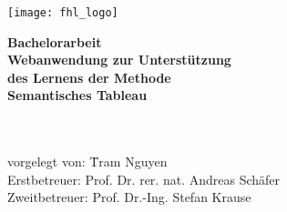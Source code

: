 \begin{center}

\vspace*{-2cm}

\texttt{[image: fhl\_logo]}

\vspace*{3cm}

{\Large \textbf{Bachelorarbeit}}\\ %

\vspace{2.0cm}
{\Huge \textbf{Webanwendung zur Unterstützung }}\\
\vspace*{3mm}
{\Huge \textbf{des Lernens der Methode}}\\
\vspace*{3mm}
{\Huge \textbf{Semantisches Tableau}}\\
\vspace*{3mm}
{\Huge \textbf{}}\\
\vspace*{3mm}
{\Huge \textbf{}}\\

\vspace{1.5cm}

%
\vspace{4cm}

\parbox{1cm}{
\begin{large}
\begin{tabbing}
vorgelegt von: \hspace{.5cm} \=Tram Nguyen\\

Erstbetreuer: \>Prof. Dr. rer. nat. Andreas Schäfer\\
Zweitbetreuer: \>Prof. Dr.-Ing. Stefan Krause\\
\end{tabbing}
\end{large}}\\
\vspace{5mm}
\end{center}
